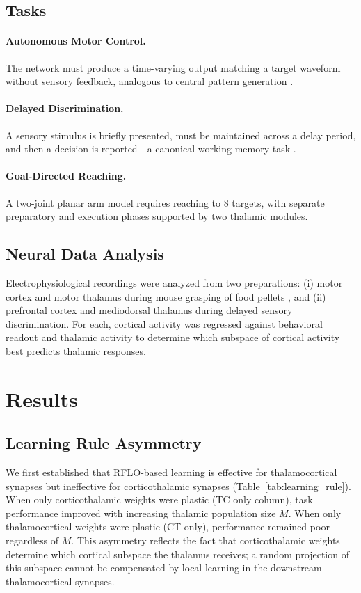 \documentclass[11pt]{article}
\begin{document}
\subsection{Tasks}

\paragraph{Autonomous Motor Control.} The network must produce a time-varying output matching a target waveform without sensory feedback, analogous to central pattern generation \citep{sussillo2009generating}.

\paragraph{Delayed Discrimination.} A sensory stimulus is briefly presented, must be maintained across a delay period, and then a decision is reported---a canonical working memory task \citep{guo2017maintenance}.

\paragraph{Goal-Directed Reaching.} A two-joint planar arm model requires reaching to 8 targets, with separate preparatory and execution phases supported by two thalamic modules.

\subsection{Neural Data Analysis}

Electrophysiological recordings were analyzed from two preparations: (i) motor cortex and motor thalamus during mouse grasping of food pellets \citep{sauerbrei2020cortical}, and (ii) prefrontal cortex and mediodorsal thalamus during delayed sensory discrimination. For each, cortical activity was regressed against behavioral readout and thalamic activity to determine which subspace of cortical activity best predicts thalamic responses.

\section{Results}

\subsection{Learning Rule Asymmetry}

We first established that RFLO-based learning is effective for thalamocortical synapses but ineffective for corticothalamic synapses (Table~\ref{tab:learning_rule}). When only corticothalamic weights were plastic (TC only column), task performance improved with increasing thalamic population size $M$. When only thalamocortical weights were plastic (CT only), performance remained poor regardless of $M$. This asymmetry reflects the fact that corticothalamic weights determine which cortical subspace the thalamus receives; a random projection of this subspace cannot be compensated by local learning in the downstream thalamocortical synapses.
\end{document}

